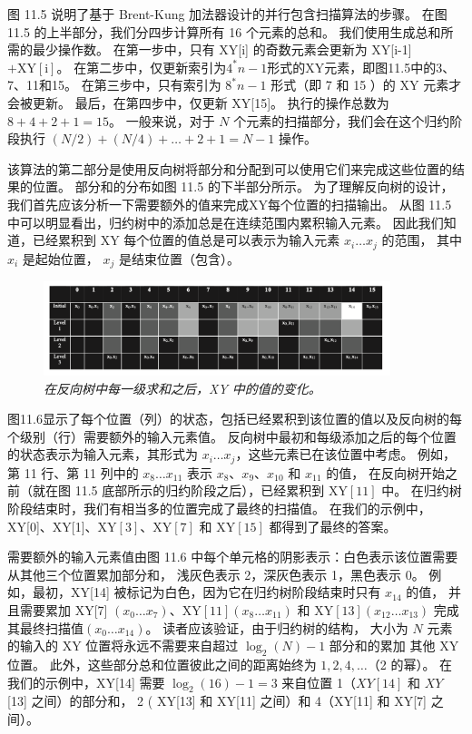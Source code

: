 图 11.5 说明了基于 Brent-Kung 加法器设计的并行包含扫描算法的步骤。 
在图 11.5 的上半部分，我们分四步计算所有 16 个元素的总和。 我们使用生成总和所需的最少操作数。 
在第一步中，只有 XY[i] 的奇数元素会更新为 XY[i-1] $+\mathrm{XY}[\mathrm{i}]$。 
在第二步中，仅更新索引为$4^{*} n-1$形式的XY元素，即图11.5中的3、7、11和15。 
在第三步中，只有索引为 $8^{*} n-1$ 形式（即 7 和 15 ）的 XY 元素才会被更新。 
最后，在第四步中，仅更新 XY[15]。 执行的操作总数为$8+4+2+1=15$。 
一般来说，对于 $N$ 个元素的扫描部分，我们会在这个归约阶段执行 $(N / 2)+(N / 4)+\ldots+2+1=N-1$ 操作。

该算法的第二部分是使用反向树将部分和分配到可以使用它们来完成这些位置的结果的位置。 
部分和的分布如图 11.5 的下半部分所示。 为了理解反向树的设计，我们首先应该分析一下需要额外的值来完成XY每个位置的扫描输出。 
从图 11.5 中可以明显看出，归约树中的添加总是在连续范围内累积输入元素。 
因此我们知道，已经累积到 XY 每个位置的值总是可以表示为输入元素 $x_{i} \ldots x_{j}$ 的范围，
其中 $x_{i}$ 是起始位置， $x_{j}$ 是结束位置（包含）。

\begin{figure}[H]
	\centering
	\includegraphics[width=0.9\textwidth]{figs/F11.6.png}
	\caption{\textit{在反向树中每一级求和之后，XY 中的值的变化。}}
\end{figure}

图11.6显示了每个位置（列）的状态，包括已经累积到该位置的值以及反向树的每个级别（行）需要额外的输入元素值。 
反向树中最初和每级添加之后的每个位置的状态表示为输入元素，其形式为 $x_{i} \ldots x_{j}$，这些元素已在该位置中考虑。 
例如，第 11 行、第 11 列中的 $x_{8} \ldots x_{11}$ 表示 $x_{8}、x_{9}、x_{10}$ 和 $x_{11}$ 的值，
在反向树开始之前（就在图 11.5 底部所示的归约阶段之后），已经累积到 $\mathrm{XY}[11]$ 中。 
在归约树阶段结束时，我们有相当多的位置完成了最终的扫描值。 
在我们的示例中，XY[0]、XY[1]、$\mathrm{XY}[3]$、$\mathrm{XY}[7]$ 和 $\mathrm{XY}[15]$ 都得到了最终的答案。

需要额外的输入元素值由图 11.6 中每个单元格的阴影表示：白色表示该位置需要从其他三个位置累加部分和，
浅灰色表示 2，深灰色表示 1，黑色表示 0。 
例如，最初，XY[14] 被标记为白色，因为它在归约树阶段结束时只有 $x_{14}$ 的值，
并且需要累加 XY[7] $\left(x_ {0} \ldots x_{7}\right)、\mathrm{XY}[11]\left(x_{8} \ldots x_{11}\right)$ 
和 $\mathrm{XY}[13]\left(x_{12} \ldots x_{13}\right)$ 
完成其最终扫描值$\left(x_{0} \ldots x_{14}\right)$。 
读者应该验证，由于归约树的结构，
大小为 $N$ 元素的输入的 XY 位置将永远不需要来自超过 $\log _{2}(N)-1$ 部分和的累加 其他 XY 位置。 
此外，这些部分总和位置彼此之间的距离始终为 $1,2,4, \ldots$（2 的幂）。 
在我们的示例中，XY[14] 需要 $\log _{2}(16)-1=3$ 来自位置 1（$X Y[14]$ 和 $X Y$ [13] 之间）的部分和，
2 ( XY[13] 和 XY[11] 之间）和 4（XY[11] 和 XY[7] 之间）。

